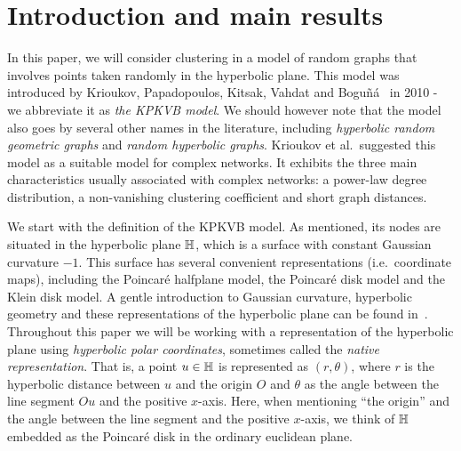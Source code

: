 \section{Introduction and main results}



In this paper, we will consider clustering in a model of random graphs that involves points taken randomly in the hyperbolic plane. This model was introduced by Krioukov, Papadopoulos, Kitsak, Vahdat and Bogu\~{n}\'a~\cite{krioukov2010hyperbolic} in 
2010 - we abbreviate it as \emph{the KPKVB model}. We should however note that the model also goes by several other names in the literature, including {\em hyperbolic random geometric graphs} and {\em random hyperbolic graphs}. Krioukov et al.~suggested this model as a suitable model for complex networks. It exhibits the three main characteristics usually associated with complex networks: a power-law degree distribution, a non-vanishing clustering coefficient and short graph distances.

%


We start with the definition of the KPKVB model. As mentioned, its nodes are situated in the hyperbolic plane ${\mathbb H}$, which is a surface with constant Gaussian curvature $-1$. This surface has several convenient representations (i.e.~coordinate maps), including the Poincar\'e halfplane model, the Poincar\'e disk model and the Klein disk model. A gentle introduction to Gaussian curvature, hyperbolic geometry and these representations of the hyperbolic plane can be found in~\cite{stillwell2012geometry}. Throughout this paper we will be working with a representation of the hyperbolic plane using {\em hyperbolic polar coordinates}, sometimes called the {\em native representation}. That is, a point $u \in {\mathbb H}$ is represented as $(r,\theta)$, where $r$ is the hyperbolic distance between $u$ and the origin $O$ and $\theta$ as the angle between the line segment $Ou$ and the positive $x$-axis. 
Here, when mentioning ``the origin'' and the angle between the line segment and the positive $x$-axis, we think of ${\mathbb H}$ embedded as the Poincar\'e disk in the ordinary euclidean plane.

